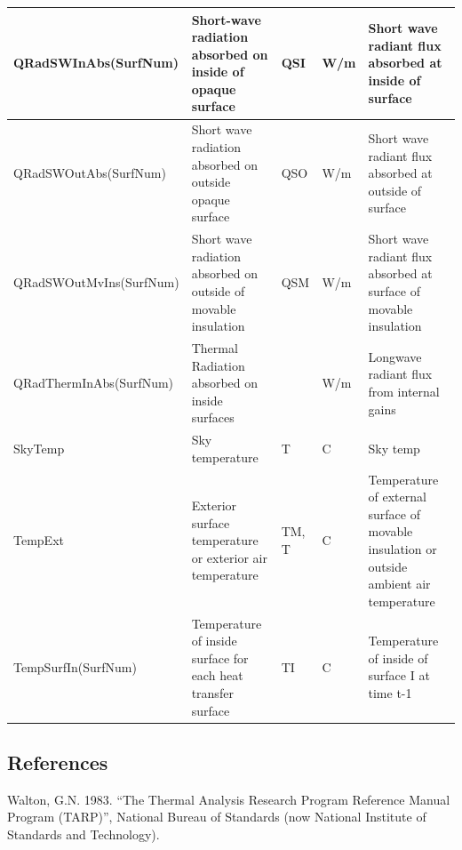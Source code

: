 \begin{longtable}[c]{p{1.8in}p{1.2in}p{0.9in}p{0.9in}p{1.2in}}
QRadSWInAbs(SurfNum) & Short-wave radiation absorbed on inside of opaque surface & QSI & W/m & Short wave radiant flux absorbed at inside of surface \tabularnewline \midrule
QRadSWOutAbs(SurfNum) & Short wave radiation absorbed on outside opaque surface & QSO & W/m & Short wave radiant flux absorbed at outside of surface \tabularnewline \midrule
QRadSWOutMvIns(SurfNum) & Short wave radiation absorbed on outside of movable insulation & QSM & W/m & Short wave radiant flux absorbed at surface of movable insulation \tabularnewline \midrule
QRadThermInAbs(SurfNum) & Thermal Radiation absorbed on inside surfaces & ~ & W/m & Longwave radiant flux from internal gains \tabularnewline \midrule
SkyTemp & Sky temperature & T & C & Sky temp \tabularnewline \midrule
TempExt & Exterior surface temperature or exterior air temperature & TM, T & C & Temperature of external surface of movable insulation or outside ambient air temperature \tabularnewline \midrule
TempSurfIn(SurfNum) & Temperature of inside surface for each heat transfer surface & TI & C & Temperature of inside of surface I at time t-1 \tabularnewline
\bottomrule
\end{longtable}

\subsection{References}\label{references-044}

Walton, G.N. 1983. ``The Thermal Analysis Research Program Reference Manual Program (TARP)'', National Bureau of Standards (now National Institute of Standards and Technology).
